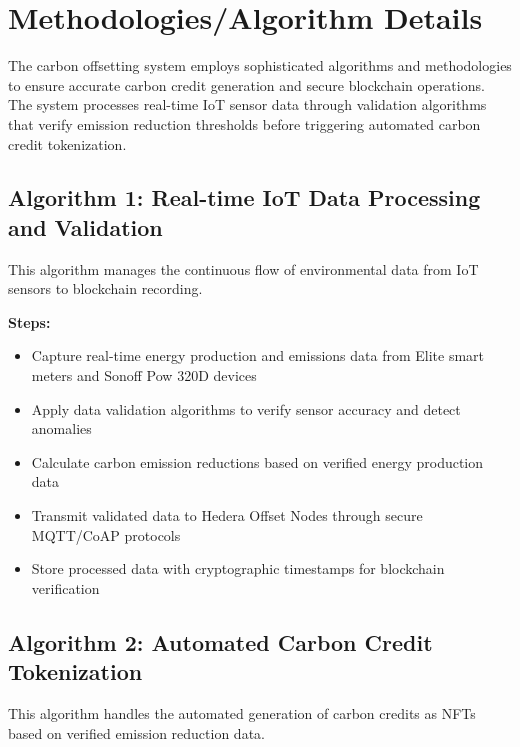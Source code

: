 \documentclass[oneside,a4paper,12pt]{book}
\begin{document}
  \section{Methodologies/Algorithm Details}
  \begin{flushleft}
    The carbon offsetting system employs sophisticated algorithms and methodologies to ensure accurate carbon credit generation and secure blockchain operations. The system processes real-time IoT sensor data through validation algorithms that verify emission reduction thresholds before triggering automated carbon credit tokenization.
  \end{flushleft}
  
  \subsection{Algorithm 1: Real-time IoT Data Processing and Validation}
  \begin{flushleft}
    This algorithm manages the continuous flow of environmental data from IoT sensors to blockchain recording.
  \end{flushleft}
  
  \begin{flushleft}
    \textbf{Steps:}
    \begin{itemize}
      \item Capture real-time energy production and emissions data from Elite smart meters and Sonoff Pow 320D devices
      \item Apply data validation algorithms to verify sensor accuracy and detect anomalies
      \item Calculate carbon emission reductions based on verified energy production data
      \item Transmit validated data to Hedera Offset Nodes through secure MQTT/CoAP protocols
      \item Store processed data with cryptographic timestamps for blockchain verification
    \end{itemize}
  \end{flushleft}
  
  \subsection{Algorithm 2: Automated Carbon Credit Tokenization}
  \begin{flushleft}
    This algorithm handles the automated generation of carbon credits as NFTs based on verified emission reduction data.
  \end{flushleft}
  
\end{document}
